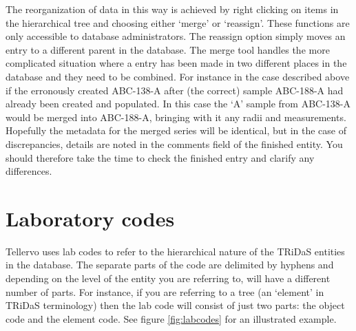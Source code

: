 The reorganization of data in this way is achieved by right clicking on items in the hierarchical tree and choosing either `merge' or `reassign'.  These functions are only accessible to database administrators.  The reassign option simply moves an entry to a different parent in the database.  The merge tool handles the more complicated situation where a entry has been made in two different places in the database and they need to be combined.  For instance in the case described above if the erronously created ABC-138-A after (the correct) sample  ABC-188-A had already been created and populated.  In this case the `A' sample from ABC-138-A would be merged into ABC-188-A, bringing with it any radii and measurements.  Hopefully the metadata for the merged series will be identical, but in the case of discrepancies, details are noted in the comments field of the finished entity.  You should therefore take the time to check the finished entry and clarify any differences.


\section{Laboratory codes}
Tellervo uses lab codes to refer to the hierarchical nature of the TRiDaS entities in the database.  The separate parts of the code are delimited by hyphens and depending on the level of the entity you are referring to, will have a different number of parts.  For instance, if you are referring to a tree (an `element' in TRiDaS terminology) then the lab code will consist of just two parts: the object code and the element code.  See figure \ref{fig:labcodes} for an illustrated example.

